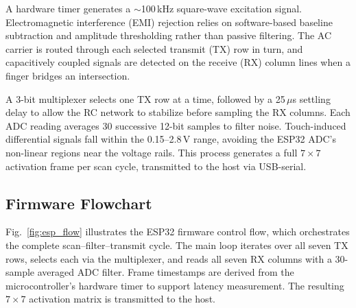 \documentclass[conference]{IEEEtran}
\begin{document}
    A hardware timer generates a $\sim$100\,kHz square-wave excitation signal. Electromagnetic interference (EMI) 
    rejection relies on software-based baseline subtraction and amplitude thresholding rather than passive filtering. 
    The AC carrier is routed through each selected transmit (TX) row in turn, and capacitively coupled signals are 
    detected on the receive (RX) column lines when a finger bridges an intersection.

    A 3-bit multiplexer selects one TX row at a time, followed by a 25\,$\mu$s settling delay to allow the RC network 
    to stabilize before sampling the RX columns. Each ADC reading averages 30 successive 12-bit samples to filter noise. 
    Touch-induced differential signals fall within the 0.15--2.8\,V range, avoiding the ESP32 ADC's non-linear regions near 
    the voltage rails. This process generates a full $7\times7$ activation frame per scan cycle, transmitted to the host via 
    USB-serial. 

    \subsection{Firmware Flowchart}

    Fig.~\ref{fig:esp_flow} illustrates the ESP32 firmware control flow, which orchestrates the complete scan--filter--transmit cycle. 
    The main loop iterates over all seven TX rows, selects each via the multiplexer, and reads all seven RX columns 
    with a 30-sample averaged ADC filter. Frame timestamps are derived from the microcontroller's hardware timer to support latency measurement. 
    The resulting $7\times7$ activation matrix is transmitted to the host.
\end{document}
